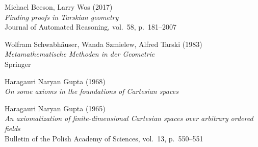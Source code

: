 \documentclass[10pt,a4paper,parskip=half,numbers=endperiod,headings=standardclasses,parskip]{scrartcl}
\begin{document}
  Michael Beeson, Larry Wos (2017)
  \\ \textit{Finding proofs in Tarskian geometry}
  \\ Journal of Automated Reasoning, vol.~58, p.~181--2007

  Wolfram Schwabhäuser, Wanda Szmielew, Alfred Tarski (1983)
  \\ \textit{Metamathematische Methoden in der Geometrie}
  \\ Springer

  Haragauri Naryan Gupta (1968)
  \\ \textit{On some axioms in the foundations of Cartesian spaces}

  Haragauri Naryan Gupta (1965)
  \\ \textit{An axiomatization of finite-dimensional Cartesian spaces over arbitrary ordered fields}
  \\ Bulletin of the Polish Academy of Sciences, vol.~13, p.~550--551

\end{document}
